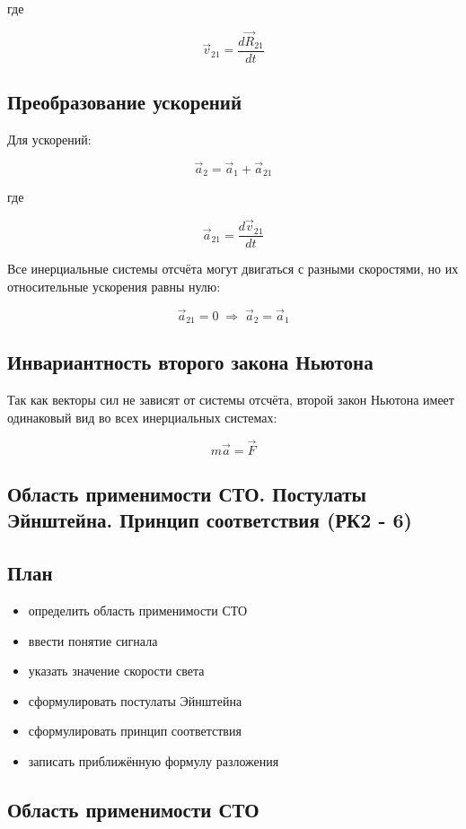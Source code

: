 \documentclass[a4paper,12pt]{article}
\begin{document}
где

\[
\vec v_{21} =
\frac{d \vec R_{21}}{dt}
\]

\subsection*{Преобразование ускорений}

Для ускорений:

\[
\vec a_2 = \vec a_1 + \vec a_{21}
\]

где

\[
\vec a_{21} =
\frac{d \vec v_{21}}{dt}
\]

Все инерциальные системы отсчёта могут двигаться с разными скоростями, но их относительные ускорения равны нулю:

\[
\vec a_{21} = 0 \;\Rightarrow\; \vec a_2 = \vec a_1
\]

\subsection*{Инвариантность второго закона Ньютона}

Так как векторы сил не зависят от системы отсчёта, второй закон Ньютона имеет одинаковый вид во всех инерциальных системах:

\begin{theorembox}
\[
m \vec a = \vec F
\]
\end{theorembox}

\subsection{Область применимости СТО. Постулаты Эйнштейна. Принцип соответствия (РК2 - 6)}

\subsection*{План}
\begin{itemize}
\item определить область применимости СТО
\item ввести понятие сигнала
\item указать значение скорости света
\item сформулировать постулаты Эйнштейна
\item сформулировать принцип соответствия
\item записать приближённую формулу разложения
\end{itemize}

\subsection*{Область применимости СТО}
\end{document}
